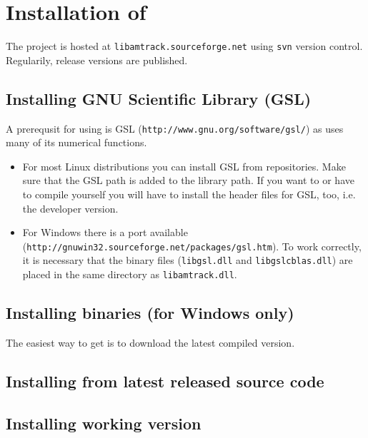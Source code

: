 
\chapter{Installation of \la{}}

The \la{} project is hosted at \texttt{libamtrack.sourceforge.net} using \texttt{svn} version control. Regularily, release versions are published.

\section{Installing GNU Scientific Library (GSL)}

A prerequsit for using \la{} is GSL (\texttt{http://www.gnu.org/software/gsl/}) as \la{} uses many of its numerical functions.

\begin{itemize}
\item{For most Linux distributions you can install GSL from repositories. Make sure that the GSL path is added to the library path. If you want to or have to compile \la{} yourself you will have to install the header files for GSL, too, i.e. the developer version.}
\item{For Windows there is a port available (\texttt{http://gnuwin32.sourceforge.net/packages/gsl.htm}). To work correctly, it is necessary that the binary files (\texttt{libgsl.dll} and \texttt{libgslcblas.dll}) are placed in the same directory as \texttt{libamtrack.dll}.}
\end{itemize}

\section{Installing \la{} binaries (for Windows only)}
The easiest way to get \la{} is to download the latest compiled version.

\section{Installing \la{} from latest released source code}

\section{Installing \la{} working version}

